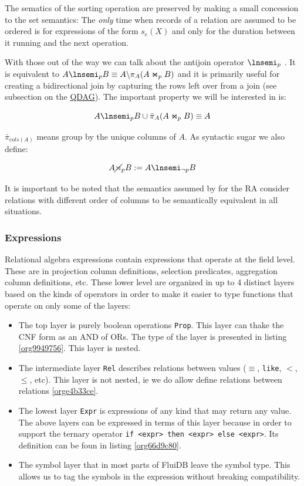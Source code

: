 The sematics of the sorting operation are preserved by making a small
concession to the set semantics: The \emph{only} time when records of a
relation are assumed to be ordered is for expressions of the form
\(s_e(X)\) and only for the duration between it running and the next
operation.

With those out of the way we can talk about the antijoin operator
\(\lnsemi_p\) . It is equivalent to \(A \lnsemi_p B \equiv A \backslash
\pi_A(A \Join_p B)\) and it is primarily useful for creating a
bidirectional join by capturing the rows left over from a join (see
subsection on the \hyperref[sec:org5a9ec3b]{QDAG}). The important property we will be interested
in is:

\[
  A \lnsemi_p B \cup \bar\pi_A(A \Join_p B) \equiv A
\]

\(\bar{\pi}_{cols(A)}\) means group by the unique columns of \(A\).  As
syntactic sugar we also define:

\[
  A \rnsemi_p B := A \lnsemi_{\neg p} B
\]

It is important to be noted that the semantics assumed by for the RA
consider relations with different order of columns to be semantically
equivalent in all situations.

\subsubsection{Expressions}
\label{sec:orgaa9cf48}

Relational algebra expressions contain expressions that operate at the
field level. These are in projection column definitions, selection
predicates, aggregation column definitions, etc. These lower level are
organized in up to 4 distinct layers based on the kinds of operators
in order to make it easier to type functions that operate on only some
of the layers:

\begin{itemize}
\item The top layer is purely boolean operations \texttt{Prop}. This layer can
  thake the CNF form as an AND of ORs. The type of the layer is
  presented in listing \ref{org9949756}. This layer is nested.
\item The intermediate layer \texttt{Rel} describes relations between values
  (\(\equiv\), \texttt{like}, \(<\), \(\le\), etc). This layer is not
  nested, ie we do allow define relations between relations
  \ref{orge4b33ce}.
\item The lowest layer \texttt{Expr} is expressions of any kind that may return
  any value. The above layers can be expressed in terms of this layer
  because in order to support the ternary operator \texttt{if <expr> then
    <expr> else <expr>}. Its definition can be foun in listing \ref{org66d9c80}.
\item The symbol layer that in most parts of FluiDB leave the symbol
  type. This allows us to tag the symbols in the expression without
  breaking compatibility.
\end{itemize}

